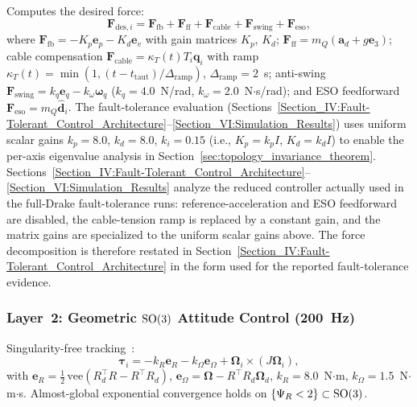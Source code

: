 Computes the desired force:
\begin{equation}\label{eq:layer1_force}
  \bm{F}_{\mathrm{des},i} = \bm{F}_{\mathrm{fb}} + \bm{F}_{\mathrm{ff}} + \bm{F}_{\mathrm{cable}} + \bm{F}_{\mathrm{swing}} + \bm{F}_{\mathrm{eso}},
\end{equation}
where $\bm{F}_{\mathrm{fb}} = -K_p \bm{e}_p - K_d \bm{e}_v$ with gain matrices $K_p$, $K_d$; $\bm{F}_{\mathrm{ff}} = m_Q(\bm{a}_d + g\bm{e}_3)$; cable compensation $\bm{F}_{\mathrm{cable}} = \kappa_T(t) T_i \bm{q}_i$ with ramp $\kappa_T(t) = \min(1, (t - t_{\mathrm{taut}})/\Delta_{\mathrm{ramp}})$, $\Delta_{\mathrm{ramp}} = 2$~s; anti-swing $\bm{F}_{\mathrm{swing}} = k_q \bm{e}_q - k_\omega \bm{\omega}_q$ ($k_q = 4.0$~N/rad, $k_\omega = 2.0$~N$\cdot$s/rad); and ESO feedforward $\bm{F}_{\mathrm{eso}} = m_Q \hat{\bm{d}}_i$. The fault-tolerance evaluation (Sections~\ref{Section_IV:Fault-Tolerant_Control_Architecture}--\ref{Section_VI:Simulation_Results}) uses uniform scalar gains $k_p = 8.0$, $k_d = 8.0$, $k_i = 0.15$ (i.e., $K_p = k_p I$, $K_d = k_d I$) to enable the per-axis eigenvalue analysis in Section~\ref{sec:topology_invariance_theorem}.
Sections~\ref{Section_IV:Fault-Tolerant_Control_Architecture}--\ref{Section_VI:Simulation_Results} analyze the reduced controller actually used in the full-Drake fault-tolerance runs: reference-acceleration and ESO feedforward are disabled, the cable-tension ramp is replaced by a constant gain, and the matrix gains are specialized to the uniform scalar gains above. The force decomposition is therefore restated in Section~\ref{Section_IV:Fault-Tolerant_Control_Architecture} in the form used for the reported fault-tolerance evidence.

\subsubsection{Layer~2: Geometric $\mathrm{SO}(3)$ Attitude Control (200~Hz)}

Singularity-free tracking~\cite{lee2010geometric}:
\begin{equation}\label{eq:layer2_attitude}
  \bm{\tau}_i = -k_R \bm{e}_R - k_\Omega \bm{e}_\Omega + \bm{\Omega}_i \times (J\bm{\Omega}_i),
\end{equation}
with $\bm{e}_R = \tfrac{1}{2}\,\mathrm{vee}(R_d^\top R - R^\top R_d)$, $\bm{e}_\Omega = \bm{\Omega} - R^\top R_d \bm{\Omega}_d$, $k_R = 8.0$~N$\cdot$m, $k_\Omega = 1.5$~N$\cdot$m$\cdot$s. Almost-global exponential convergence holds on $\{\Psi_R < 2\} \subset \mathrm{SO}(3)$.

